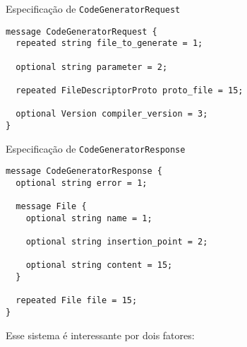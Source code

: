 \begin{listing}[ht]
\caption{Especificação de \texttt{CodeGeneratorRequest}}
\label{lst:code-gen-req}
\begin{verbatim}
message CodeGeneratorRequest {
  repeated string file_to_generate = 1;

  optional string parameter = 2;

  repeated FileDescriptorProto proto_file = 15;

  optional Version compiler_version = 3;
}
\end{verbatim}
\end{listing}

\begin{listing}[ht]
\caption{Especificação de \texttt{CodeGeneratorResponse}}
\label{lst:code-gen-res}
\begin{verbatim}
message CodeGeneratorResponse {
  optional string error = 1;

  message File {
    optional string name = 1;

    optional string insertion_point = 2;

    optional string content = 15;
  }

  repeated File file = 15;
}
\end{verbatim}
\end{listing}

Esse sistema é interessante por dois fatores:

